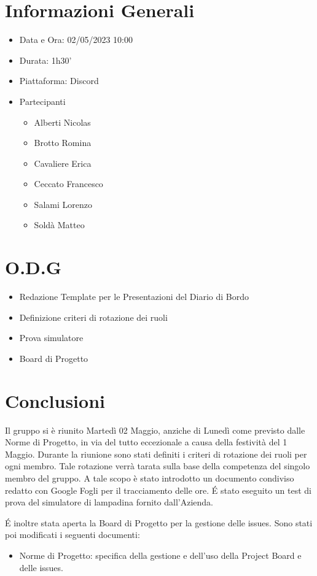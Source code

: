 \documentclass[a4paper, 12pt]{article}
\begin{document}
\makefrontpage

\section*{Informazioni Generali}
\begin{itemize}
    \item Data e Ora: 02/05/2023 10:00
    \item Durata: 1h30'
    \item Piattaforma: Discord
    \item Partecipanti
    \begin{itemize}
        \item Alberti Nicolas
        \item Brotto Romina
        \item Cavaliere Erica
        \item Ceccato Francesco
        \item Salami Lorenzo
        \item Soldà Matteo
    \end{itemize}
\end{itemize}

\section*{O.D.G}
\begin{itemize}
    \item Redazione Template per le Presentazioni del Diario di Bordo
    \item Definizione criteri di rotazione dei ruoli
    \item Prova simulatore
    \item Board di Progetto
\end{itemize}

\section*{Conclusioni}
\indent Il gruppo si è riunito Martedì 02 Maggio, anziche di Lunedì come previsto dalle Norme di Progetto, in via del tutto eccezionale a causa della festività del 1 Maggio.\newline
\indent Durante la riunione sono stati definiti i criteri di rotazione dei ruoli per ogni membro. Tale rotazione verrà tarata sulla base della competenza del singolo membro del gruppo. A tale scopo è stato introdotto un documento condiviso redatto con Google Fogli per il tracciamento delle ore.
\newline
\'E stato eseguito un test di prova del simulatore di lampadina fornito dall'Azienda.

\indent \'E inoltre stata aperta la Board di Progetto per la gestione delle issues.
Sono stati poi modificati i seguenti documenti:

\begin{itemize}
    \item Norme di Progetto: specifica della gestione e dell'uso della Project Board e delle issues.
\end{itemize}
\end{document}
